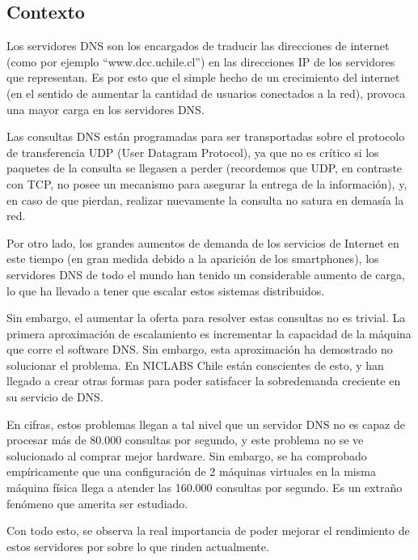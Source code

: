 \documentclass[12pt,spanish,letterpaper]{article}
\begin{document}
\subsection{Contexto}
\par Los servidores DNS son los encargados de traducir las direcciones de internet (como por ejemplo \textquotedblleft www.dcc.uchile.cl\textquotedblright) en las direcciones IP de los servidores que representan. Es por esto que el simple hecho de un crecimiento del internet (en el sentido de aumentar la cantidad de usuarios conectados a la red), provoca una mayor carga en los servidores DNS.
\par Las consultas DNS están programadas para ser transportadas sobre el protocolo de transferencia UDP (User Datagram Protocol), ya que no es crítico si los paquetes de la consulta se llegasen a perder (recordemos que UDP, en contraste con TCP, no posee un mecanismo para asegurar la entrega de la información), y, en caso de que pierdan, realizar nuevamente la consulta no satura en demasía la red.
\par Por otro lado, los grandes aumentos de demanda de los servicios de Internet en este tiempo (en gran medida debido a la aparición de los smartphones), los servidores DNS de todo el mundo han tenido un considerable aumento de carga, lo que ha llevado a tener que escalar estos sistemas distribuidos.
\par Sin embargo, el aumentar la oferta para resolver estas consultas no es trivial. La primera aproximación de escalamiento es incrementar la capacidad de la máquina que corre el software DNS. Sin embargo, esta aproximación ha demostrado no solucionar el problema. En NICLABS Chile están conscientes de esto, y han llegado a crear otras formas para poder satisfacer la sobredemanda creciente en su servicio de DNS.
\par En cifras, estos problemas llegan a tal nivel que un servidor DNS no es capaz de procesar más de 80.000 consultas por segundo, y este problema no se ve solucionado al comprar mejor hardware. Sin embargo, se ha comprobado empíricamente que una configuración de 2 máquinas virtuales en la misma máquina física llega a atender las 160.000 consultas por segundo. Es un extraño fenómeno que amerita ser estudiado.
\par Con todo esto, se observa la real importancia de poder mejorar el rendimiento de estos servidores por sobre lo que rinden actualmente.
\end{document}
